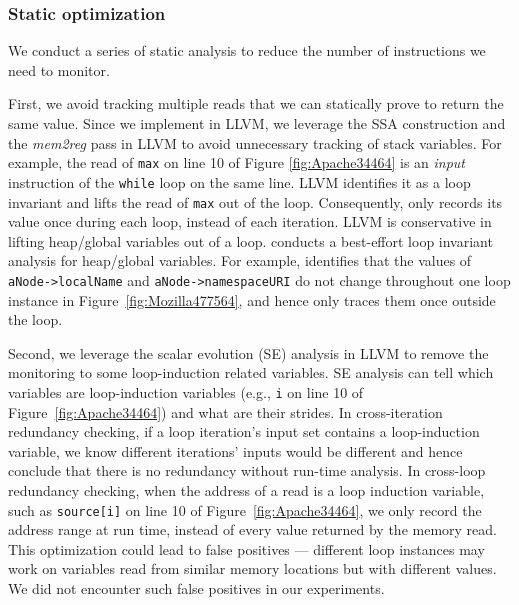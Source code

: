 \subsubsection{Static optimization}
\label{sec:perf}

We conduct a series of static analysis to reduce the number of instructions we 
need to monitor. 

First, we avoid tracking multiple reads that we can statically 
prove to return the same value.
Since we implement \Tool in LLVM, we leverage the SSA construction and the
\textit{mem2reg} pass in LLVM to avoid unnecessary tracking of
stack variables.
For example, the read of \texttt{max} on line 10 of 
Figure \ref{fig:Apache34464} is an \textit{input} instruction of the 
\texttt{while} loop on the same line. LLVM identifies it as a loop invariant
and lifts the read of \texttt{max}
out of the loop. Consequently, \Tool only records
its value once during each loop, instead of each iteration.
LLVM is conservative in lifting heap/global variables out of
a loop.
\Tool conducts a best-effort
loop invariant analysis for heap/global variables.
For example, \Tool identifies that the values of
\texttt{aNode->localName} and \texttt{aNode->namespaceURI} do not change
throughout one loop instance
in Figure~\ref{fig:Mozilla477564}, and hence only traces them once
outside the loop.


Second, we leverage the scalar evolution (SE) analysis in LLVM to remove the 
monitoring to some loop-induction related variables.
SE analysis can tell which variables are
loop-induction variables (e.g., \texttt{i} on line 10
of Figure~\ref{fig:Apache34464}) and what are their strides. 
In cross-iteration redundancy checking,
if a loop iteration's input set contains a loop-induction
variable, we know different iterations' inputs would be different and 
hence conclude that there is no redundancy without
run-time analysis.
In cross-loop redundancy checking,
when the address of a read is a loop induction variable, such as
\texttt{source[i]} on line 10 of Figure~\ref{fig:Apache34464},
we only record the address range at run time,
instead of every value returned by the memory read.
This optimization could lead to false positives ---
different loop instances may work on variables read from
similar memory locations but with different values.
We did not encounter such false positives in our experiments.


